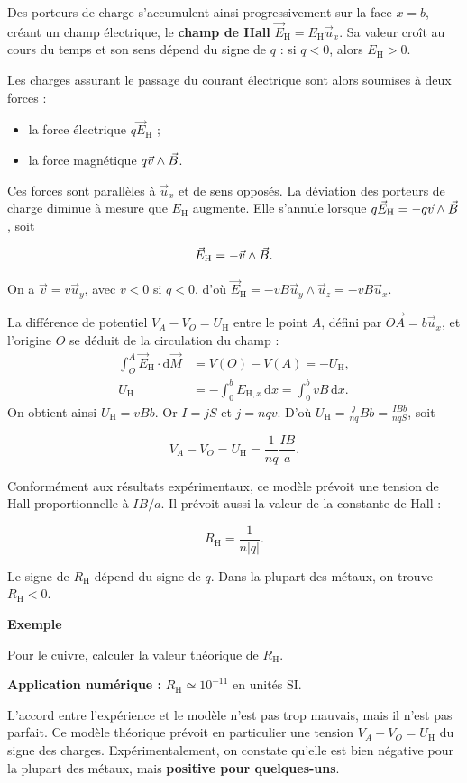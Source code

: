 \documentclass[11pt,a4paper]{article}
\newcommand{\dd}{\mathrm d}
\newcommand{\vv}{\vec v}
\newcommand{\ux}{\vec u_x}\newcommand{\uy}{\vec u_y}\newcommand{\uz}{\vec u_z}
\newcommand{\examtitle}[1]{\textbf{#1}\par\nobreak}
\newcommand{\fle}[1]{\overrightarrow{#1}}
\newcommand{\module}[1]{\left\lvert #1\right\rvert}
\newcommand{\EH}{\vec E_{\mathrm H}}
\newcommand{\UH}{U_{\mathrm H}}
\newcommand{\RH}{R_{\mathrm H}}
\newcommand{\bmath}[1]{\begin{cadre}\[#1\]\end{cadre}}
\begin{document}
Des porteurs de charge s'accumulent ainsi progressivement sur la face \(x=b\), créant un champ
électrique, le \textbf{champ de Hall} \(\EH=E_{\mathrm H}\ux\). Sa valeur croît au cours du temps et son sens
dépend du signe de \(q\) : si \(q<0\), alors \(E_{\mathrm H}>0\).

Les charges assurant le passage du courant électrique sont alors soumises à deux forces :
\begin{itemize}
\item la force électrique \(q\EH\) ;
\item la force magnétique \(q\vv\wedge\vB\).
\end{itemize}
Ces forces sont parallèles à \(\ux\) et de sens opposés. La déviation des porteurs de charge
diminue à mesure que \(E_{\mathrm H}\) augmente. Elle s'annule lorsque
\(q\EH=-q\vv\wedge\vB\), soit
\bmath{\EH=-\vv\wedge\vB.}
On a \(\vv=v\uy\), avec \(v<0\) si \(q<0\), d'où
\(\EH=-vB\uy\wedge\uz=-vB\ux\).

La différence de potentiel \(V_A-V_O=\UH\) entre le point \(A\), défini par
\(\fle{OA}=b\ux\), et l'origine \(O\) se déduit de la circulation du champ :
\begin{align*}
 \int_O^A\EH\cdot\dd\vec M&=V(O)-V(A)=-\UH,\\
 \UH&=-\int_0^b E_{\mathrm H,x}\,\dd x
      =\int_0^b vB\,\dd x .
\end{align*}\label{verif:hallint}
On obtient ainsi \(\UH=vBb\). Or \(I=jS\) et \(j=nqv\).\label{verif:hallj} D'où
\(\displaystyle \UH=\frac{j}{nq}Bb=\frac{IBb}{nqS}\), soit
\bmath{V_A-V_O=\UH=\frac{1}{nq}\frac{IB}{a}.}

Conformément aux résultats expérimentaux, ce modèle prévoit une tension de Hall proportionnelle
à \(IB/a\). Il prévoit aussi la valeur de la constante de Hall :
\bmath{\RH=\frac{1}{n\module q}.}
Le signe de \(\RH\) dépend du signe de \(q\). Dans la plupart des métaux, on trouve
\(\RH<0\).\label{verif:hallr}
\begin{exemple}
\examtitle{Exemple}
Pour le cuivre, calculer la valeur théorique de \(\RH\).

\textbf{Application numérique :} \(\RH\simeq10^{-11}\) en unités SI.
\end{exemple}
L'accord entre l'expérience et le modèle n'est pas trop mauvais, mais il n'est pas parfait.
Ce modèle théorique prévoit en particulier une tension \(V_A-V_O=\UH\) du signe des charges.
Expérimentalement, on constate qu'elle est bien négative pour la plupart des métaux, mais
\textbf{positive pour quelques-uns}.
\end{document}
